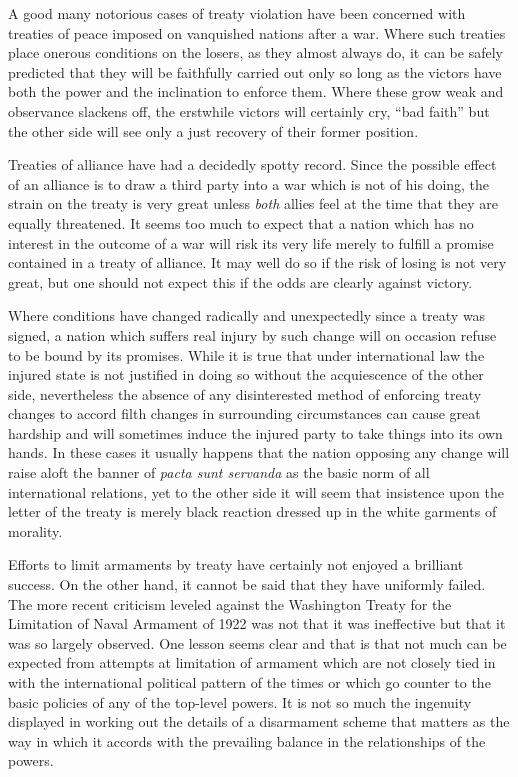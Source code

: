 \begin{introduction}
A good many notorious cases of treaty violation have been concerned with treaties of peace imposed on vanquished nations after a war. Where such treaties place onerous conditions on the losers, as they almost always do, it can be safely predicted that they will be faithfully carried out only so long as the victors have both the power and the inclination to enforce them. Where these grow weak and observance slackens off, the erstwhile victors will certainly cry, ``bad faith'' but the other side will see only a just recovery of their former position.

Treaties of alliance have had a decidedly spotty record. Since the possible effect of an alliance is to draw a third party into a war which is not of his doing, the strain on the treaty is very great unless \emph{both} allies feel at the time that they are equally threatened. It seems too much to expect that a nation which has no interest in the outcome of a war will risk its very life merely to fulfill a promise contained in a treaty of alliance. It may well do so if the risk of losing is not very great, but one should not expect this if the odds are clearly against victory.

Where conditions have changed radically and unexpectedly since a treaty was signed, a nation which suffers real injury by such change will on occasion refuse to be bound by its promises. While it is true that under international law the injured state is not justified in doing so without the acquiescence of the other side, nevertheless the absence of any disinterested method of enforcing treaty changes to accord filth changes in surrounding circumstances can cause great hardship and will sometimes induce the injured party to take things into its own hands. In these cases it usually happens that the nation opposing any change will raise aloft the banner of \emph{pacta sunt servanda} as the basic norm of all international relations, yet to the other side it will seem that insistence upon the letter of the treaty is merely black reaction dressed up in the white garments of morality.

Efforts to limit armaments by treaty have certainly not enjoyed a brilliant success. On the other hand, it cannot be said that they have uniformly failed. The more recent criticism leveled against the Washington Treaty for the Limitation of Naval Armament of 1922 was not that it was ineffective but that it was so largely observed. One lesson seems clear and that is that not much can be expected from attempts at limitation of armament which are not closely tied in with the international political pattern of the times or which go counter to the basic policies of any of the top-level powers. It is not so much the ingenuity displayed in working out the details of a disarmament scheme that matters as the way in which it accords with the prevailing balance in the relationships of the powers.


\end{introduction}
